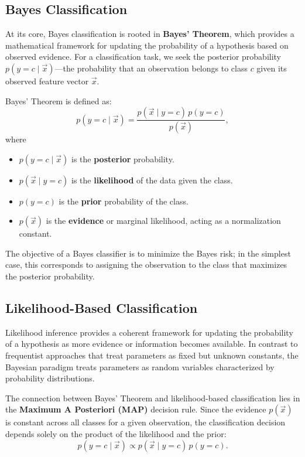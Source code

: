 \subsection{Bayes Classification}

At its core, Bayes classification is rooted in \textbf{Bayes' Theorem}, which provides a mathematical framework for updating the probability of a hypothesis based on observed evidence. For a classification task, we seek the posterior probability $p(y=c \mid \vec{x})$—the probability that an observation belongs to class $c$ given its observed feature vector $\vec{x}$.

Bayes' Theorem is defined as:
\begin{equation}
	p(y=c \mid \vec{x}) = \frac{p(\vec{x} \mid y=c) \, p(y=c)}{p(\vec{x})},
\end{equation}
where
\begin{itemize}
	\item $p(y=c \mid \vec{x})$ is the \textbf{posterior} probability.
	\item $p(\vec{x} \mid y=c)$ is the \textbf{likelihood} of the data given the class.
	\item $p(y=c)$ is the \textbf{prior} probability of the class.
	\item $p(\vec{x})$ is the \textbf{evidence} or marginal likelihood, acting as a normalization constant.
\end{itemize}

The objective of a Bayes classifier is to minimize the Bayes risk; in the simplest case, this corresponds to assigning the observation to the class that maximizes the posterior probability.

\subsection{Likelihood-Based Classification}

Likelihood inference provides a coherent framework for updating the probability of a hypothesis as more evidence or information becomes available. In contrast to frequentist approaches that treat parameters as fixed but unknown constants, the Bayesian paradigm treats parameters as random variables characterized by probability distributions.

The connection between Bayes' Theorem and likelihood-based classification lies in the \textbf{Maximum A Posteriori (MAP)} decision rule. Since the evidence $p(\vec{x})$ is constant across all classes for a given observation, the classification decision depends solely on the product of the likelihood and the prior:
\begin{equation}
	p(y=c \mid \vec{x}) \propto p(\vec{x} \mid y=c) \, p(y=c).
\end{equation}

